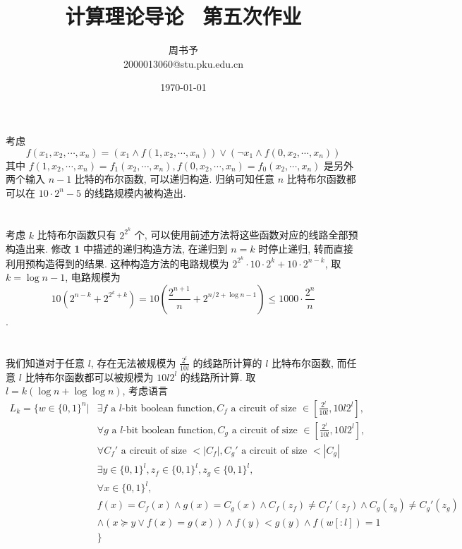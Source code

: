 \documentclass[8pt]{article}
\title{\heiti\zihao{1} 计算理论导论 \ 第五次作业}
\author{\kaishu\zihao{-3} 周书予\\2000013060@stu.pku.edu.cn}
\date{\today}
\theoremstyle{compact}
\def\le{\leqslant}
\begin{document}
\pagestyle{plain}



\maketitle

\section{}
考虑 $$f(x_1, x_2, \cdots, x_n) = (x_1 \wedge f(1, x_2, \cdots, x_n)) \vee (\lnot x_1 \wedge f(0, x_2, \cdots, x_n))$$其中 $f(1, x_2, \cdots, x_n) = f_1(x_2, \cdots, x_n), f(0, x_2, \cdots, x_n) = f_0(x_2, \cdots, x_n)$ 是另外两个输入 $n - 1$ 比特的布尔函数, 可以递归构造. 归纳可知任意 $n$ 比特布尔函数都可以在 $10 \cdot 2^n - 5$ 的线路规模内被构造出.

\section{}
考虑 $k$ 比特布尔函数只有 $2^{2^k}$ 个, 可以使用前述方法将这些函数对应的线路全部预构造出来. 修改 \textbf{1} 中描述的递归构造方法, 在递归到 $n = k$ 时停止递归, 转而直接利用预构造得到的结果. 这种构造方法的电路规模为 $2^{2^k} \cdot 10 \cdot 2^k + 10 \cdot 2^{n-k}$, 取 $k = \log n - 1$, 电路规模为 $$10\left(2^{n-k} + 2^{2^k+k}\right) = 10 \left(\frac{2^{n+1}}{n} + 2^{n/2+\log n-1}\right) \le 1000\cdot \frac{2^n}{n}$$.

\section{}
我们知道对于任意 $l$, 存在无法被规模为 $\frac{2^l}{10l}$ 的线路所计算的 $l$ 比特布尔函数, 而任意 $l$ 比特布尔函数都可以被规模为 $10l2^l$ 的线路所计算. 取 $l = k(\log n + \log\log n)$, 考虑语言
\begin{equation*}
	\begin{split}
		L_k = \{w \in \{0, 1\}^n | &\exists f \text{ a } l \text{-bit boolean function}, C_f \text{ a circuit of size } \in \left[\frac{2^l}{10l}, 10l2^l\right], \\
		&\forall g \text{ a } l \text{-bit boolean function}, C_g \text{ a circuit of size } \in \left[\frac{2^l}{10l}, 10l2^l\right], \\ &\forall C_f' \text{ a circuit of size } < |C_f|, C_g' \text{ a circuit of size } < |C_g|\\
		&\exists y \in \{0, 1\}^l, z_f \in \{0, 1\}^l, z_g \in \{0, 1\}^l,\\
		&\forall x \in \{0, 1\}^l, \\
		&f(x) = C_f(x) \wedge g(x) = C_g(x) \wedge C_f(z_f) \neq C_f'(z_f) \wedge C_g(z_g) \neq C_g'(z_g) \\ &\wedge(x \succcurlyeq y \vee f(x) = g(x)) \wedge f(y) < g(y) \wedge f(w[:l]) = 1\\
		&\}
	\end{split}
\end{equation*}
\end{document}
